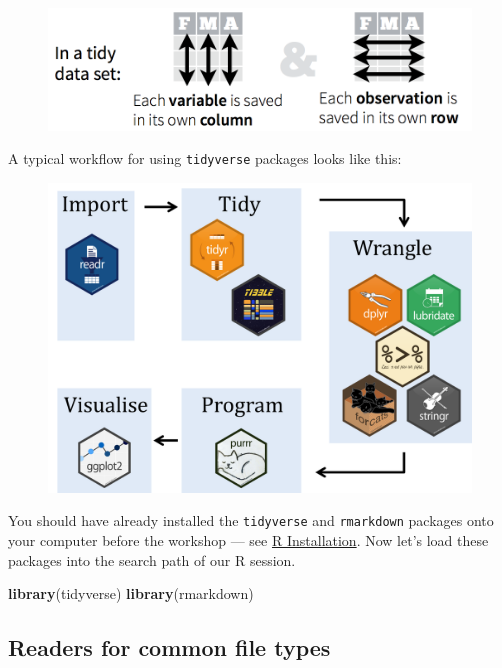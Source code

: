 \documentclass[]{book}
\newenvironment{Shaded}{\begin{snugshade}}{\end{snugshade}}
\newcommand{\KeywordTok}[1]{\textcolor[rgb]{0.13,0.29,0.53}{\textbf{#1}}}
\newcommand{\NormalTok}[1]{#1}
\begin{document}
\begin{figure}
\centering
\includegraphics{R/Rintro/images/tidy_data.png}
\caption{}
\end{figure}

A typical workflow for using \texttt{tidyverse} packages looks like
this:

\begin{figure}
\centering
\includegraphics{R/Rintro/images/tidy_workflow.png}
\caption{}
\end{figure}

You should have already installed the \texttt{tidyverse} and
\texttt{rmarkdown} packages onto your computer before the workshop ---
see \href{./Rinstall.html}{R Installation}. Now let's load these
packages into the search path of our R session.

\begin{Shaded}
\begin{Highlighting}[]
\KeywordTok{library}\NormalTok{(tidyverse)}
\KeywordTok{library}\NormalTok{(rmarkdown)}
\end{Highlighting}
\end{Shaded}

\subsection{Readers for common file
types}\label{readers-for-common-file-types}
\end{document}
